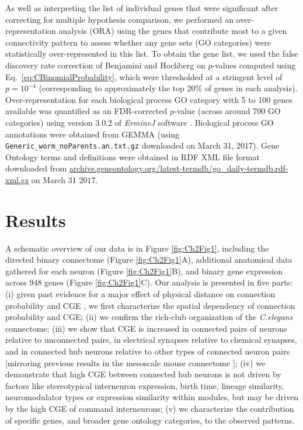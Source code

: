 As well as interpreting the list of individual genes that were significant after correcting for multiple hypothesis comparison, we performed an over-representation analysis (ORA) using the genes that contribute most to a given connectivity pattern to assess whether any gene sets (GO categories) were statistically over-represented in this list.
To obtain the gene list, we used the false discovery rate correction of Benjamini and Hochberg \citep{Benjamini1995} on $p$-values computed using Eq.~\eqref{eq:CBinomialProbability}, which were thresholded at a stringent level of $p = 10^{-4}$ (corresponding to approximately the top 20\% of genes in each analysis).
Over-representation for each biological process GO category with 5 to 100 genes available was quantified as an FDR-corrected $p$-value (across around 700 GO categories) using version 3.0.2 of \emph{ErmineJ} software \citep{Gillis2010}.
Biological process GO annotations \citep{Ashburner2000} were obtained from GEMMA \citep{Zoubarev2012} (using \texttt{Generic\_worm\_noParents.an.txt.gz} downloaded on March 31, 2017).
Gene Ontology terms and definitions were obtained in RDF XML file format downloaded from \url{archive.geneontology.org/latest-termdb/go_daily-termdb.rdf-xml.gz} on March $31$ $2017$.

\section{Results}

A schematic overview of our data is in Figure \ref{fig:Ch2Fig1}, including
the directed binary connectome (Figure \ref{fig:Ch2Fig1}A),
additional anatomical data gathered for each neuron (Figure \ref{fig:Ch2Fig1}B),
and binary gene expression across 948 genes (Figure \ref{fig:Ch2Fig1}C).
Our analysis is presented in five parts:
(i) given past evidence for a major effect of physical distance on connection probability and CGE  \citep{Fulcher2016}, we first characterize the spatial dependency of connection probability and CGE;
(ii) we confirm the rich-club organization of the \emph{C.elegans} connectome;
(iii) we show that CGE is increased in connected pairs of neurons relative to unconnected pairs, in electrical synapses relative to chemical synapses, and in connected hub neurons relative to other types of connected neuron pairs [mirroring previous results in the mesoscale mouse connectome \citep{Fulcher2016}];
(iv) we demonstrate that high CGE between connected hub neurons is not driven by factors like stereotypical interneuron expression, birth time, lineage similarity, neuromodulator types or expression similarity within modules, but may be driven by the high CGE of command interneurons;
(v) we characterize the contribution of specific genes, and broader gene ontology categories, to the observed patterns.

